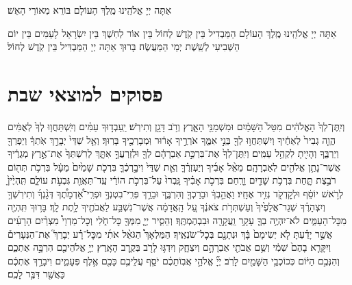\documentclass[twoside, openany, parskip=half, 11pt]{book}
\begin{document}
אַתָּה יְיָ אֱלֹהֵֽינוּ מֶֽלֶךְ הָעוֹלָם בּוֹרֵא מְאוֹרֵי הָאֵשׁ׃

אַתָּה יְיָ אֱלֹהֵֽינוּ מֶֽלֶךְ הָעוֹלָם הַמַּבְדִיל בֵּין קֹֽדֶשׁ לְחוֹל בֵּין אוֹר לְחֽשֶׁךְ בֵּין יִשְׂרָאֵל לָעַמִּים בֵּין יוֹם הַשְּׁבִיעִי לְשֵֽׁשֶׁת יְמֵי הַמַּעֲשֶׂה׃ בָּרוּךְ אַתָּה יְיָ הַמַּבְדִּיל בֵּין קֹֽדֶשׁ לְחוֹל׃

\section[פסוקים למוצ״ש]{ פסוקים למוצאי שבת }


\begin{footnotesize}
וְיִֽתֶּן־לְךָ֙ הָאֱלֹהִ֔ים מִטַּל֙ הַשָּׁמַ֔יִם וּמִשְׁמַנֵּ֖י הָאָ֑רֶץ וְרֹ֥ב דָּגָ֖ן וְתִירֹֽשׁ׃ יַֽעַבְד֣וּךָ עַמִּ֗ים וְיִֽשְׁתַּחֲו֤וּ לְךָ֙ לְאֻמִּ֔ים הֱוֵ֤ה גְבִיר֙ לְאַחֶ֔יךָ וְיִשְׁתַּחֲו֥וּ לְךָ֖ בְּנֵ֣י אִמֶּ֑ךָ אֹרְרֶ֣יךָ אָר֔וּר וּֽמְבָרְכֶ֖יךָ בָּרֽוּךְ׃
%
וְאֵ֤ל שַׁדַּי֙ יְבָרֵ֣ךְ אֹֽתְךָ֔ וְיַפְרְךָ֖ וְיַרְבֶּ֑ךָ וְהָיִ֖יתָ לִקְהַ֥ל עַמִּֽים׃ וְיִֽתֶּן־לְךָ֙ אֶת־בִּרְכַּ֣ת אַבְרָהָ֔ם לְךָ֖ וּלְזַרְעֲךָ֣ אִתָּ֑ךְ לְרִשְׁתְּךָ֙ אֶת־אֶ֣רֶץ מְגֻרֶ֔יךָ אֲשֶׁר־נָתַ֥ן אֱלֹהִ֖ים לְאַבְרָהָֽם׃
%
מֵאֵ֨ל אָבִ֜יךָ וְיַעְזְרֶ֗ךָּ וְאֵ֤ת שַׁדַּי֙ וִיבָ֣רְכֶ֔ךָּ בִּרְכֹ֤ת שָׁמַ֙יִם֙ מֵעָ֔ל בִּרְכֹ֥ת תְּה֖וֹם רֹבֶ֣צֶת תָּ֑חַת בִּרְכֹ֥ת שָׁדַ֖יִם וָרָֽחַם׃ בִּרְכֹ֣ת אָבִ֗יךָ גָּֽבְרוּ֙ עַל־בִּרְכֹ֣ת הוֹרַ֔י עַֽד־תַּאֲוַ֖ת גִּבְעֹ֣ת עוֹלָ֑ם תִּֽהְיֶ֙יןָ֙ לְרֹ֣אשׁ יוֹסֵ֔ף וּלְקׇדְקֹ֖ד נְזִ֥יר אֶחָֽיו׃
%
וַאֲהֵ֣בְךָ֔ וּבֵרַכְךָ֖ וְהִרְבֶּ֑ךָ וּבֵרַ֣ךְ פְּרִֽי־בִטְנְךָ֣ וּפְרִֽי־אַ֠דְמָתֶ֠ךָ דְּגָ֨נְךָ֜ וְתִירֹֽשְׁךָ֣ וְיִצְהָרֶ֗ךָ שְׁגַר־אֲלָפֶ֙יךָ֙ וְעַשְׁתְּרֹ֣ת צֹאנֶ֔ךָ עַ֚ל הָֽאֲדָמָ֔ה אֲשֶׁר־נִשְׁבַּ֥ע לַאֲבֹתֶ֖יךָ לָ֥תֶת לָֽךְ׃ בָּר֥וּךְ תִּֽהְיֶ֖ה מִכׇּל־הָעַמִּ֑ים לֹא־יִהְיֶ֥ה בְךָ֛ עָקָ֥ר וַֽעֲקָרָ֖ה וּבִבְהֶמְתֶּֽךָ׃ וְהֵסִ֧יר יְיָ֛ מִמְּךָ֖ כׇּל־חֹ֑לִי וְכׇל־מַדְוֵי֩ מִצְרַ֨יִם הָרָעִ֜ים אֲשֶׁ֣ר יָדַ֗עְתָּ לֹ֤א יְשִׂימָם֙ בָּ֔ךְ וּנְתָנָ֖ם בְּכׇל־שֹׂנְאֶֽיךָ׃
%
הַמַּלְאָךְ֩ הַגֹּאֵ֨ל אֹתִ֜י מִכׇּל־רָ֗ע יְבָרֵךְ֮ אֶת־הַנְּעָרִים֒ וְיִקָּרֵ֤א בָהֶם֙ שְׁמִ֔י וְשֵׁ֥ם אֲבֹתַ֖י אַבְרָהָ֣ם וְיִצְחָ֑ק וְיִדְגּ֥וּ לָרֹ֖ב בְּקֶ֥רֶב הָאָֽרֶץ׃
%
יְיָ֥ אֱלֹהֵיכֶ֖ם הִרְבָּ֣ה אֶתְכֶ֑ם וְהִנְּכֶ֣ם הַיּ֔וֹם כְּכוֹכְבֵ֥י הַשָּׁמַ֖יִם לָרֹֽב׃ יְיָ֞ אֱלֹהֵ֣י אֲבֽוֹתֵכֶ֗ם יֹסֵ֧ף עֲלֵיכֶ֛ם כָּכֶ֖ם אֶ֣לֶף פְּעָמִ֑ים וִיבָרֵ֣ךְ אֶתְכֶ֔ם כַּאֲשֶׁ֖ר דִּבֶּ֥ר לָכֶֽם׃
%

\end{footnotesize}
\end{document}
